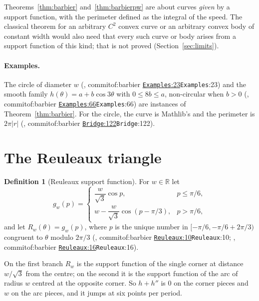 \documentclass[11pt]{article}
\theoremstyle{definition}
\newtheorem{definition}[theorem]{Definition}
\theoremstyle{remark}
\newcommand{\RR}{\mathbb{R}}
\newcommand{\commitof}[1]{\csname commitof:#1\endcsname}
\newcommand{\repo}[1]{https://github.com/jpbald93/#1}
\newcommand{\src}[4]{\ifcsname commitof:#1\endcsname
  \href{\repo{#1}/blob/\commitof{#1}/#2/#3.lean\#L#4}{\texttt{#3}:#4}\else\texttt{#3}:#4\fi}
\begin{document}
Theorems~\ref{thm:barbier} and~\ref{thm:barbierpw} are about curves \emph{given} by a support
function, with the perimeter defined as the integral of the speed. The classical theorem for an
arbitrary $C^2$ convex curve or an arbitrary convex body of constant width would also need that every
such curve or body arises from a support function of this kind; that is not proved
(Section~\ref{sec:limits}).

\paragraph{Examples.} The circle of diameter $w$ (, \src{barbier}{Barbier}{Examples}{23}) and the smooth family
$h(\theta) = a + b\cos 3\theta$ with $0\le 8b\le a$, non-circular when $b>0$ (, \src{barbier}{Barbier}{Examples}{66}) are instances of Theorem~\ref{thm:barbier}. For the circle, the
curve is Mathlib's  and the perimeter is $2\pi\lvert r\rvert$
(, \src{barbier}{Barbier}{Bridge}{122}).

\section{The Reuleaux triangle}\label{sec:reuleaux}

\begin{definition}[Reuleaux support function]\label{def:reuleaux}
For $w\in\RR$ let
\[
  g_w(p) = \begin{cases} \dfrac{w}{\sqrt3}\cos p, & p\le \pi/6,\\[1ex]
  w - \dfrac{w}{\sqrt3}\cos(p-\pi/3), & p > \pi/6,\end{cases}
\]
and let $R_w(\theta) = g_w(p)$, where $p$ is the unique number in $[-\pi/6, -\pi/6+2\pi/3)$
congruent to $\theta$ modulo $2\pi/3$ (, \src{barbier}{Barbier}{Reuleaux}{10}; , \src{barbier}{Barbier}{Reuleaux}{16}).
\end{definition}

On the first branch $R_w$ is the support function of the single corner at distance $w/\sqrt3$ from
the centre; on the second it is the support function of the arc of radius $w$ centred at the
opposite corner. So $h+h''$ is $0$ on the corner pieces and $w$ on the arc pieces, and it jumps at
six points per period.
\end{document}
